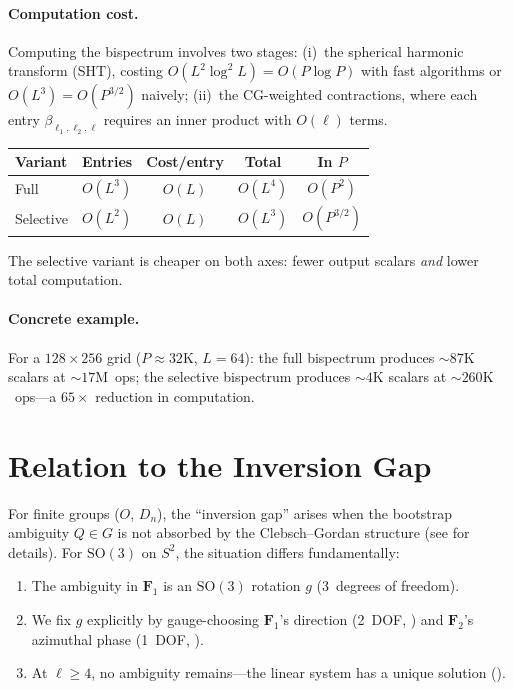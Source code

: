 \documentclass{article}
\theoremstyle{plain}
\theoremstyle{definition}
\theoremstyle{remark}
\newcommand{\SO}{\mathrm{SO}}
\begin{document}
\paragraph{Computation cost.}
Computing the bispectrum involves two stages: (i)~the spherical harmonic
transform (SHT), costing $O(L^2 \log^2 L) = O(P \log P)$ with fast
algorithms or $O(L^3) = O(P^{3/2})$ naively; (ii)~the CG-weighted
contractions, where each entry $\beta_{\ell_1,\ell_2,\ell}$ requires an
inner product with $O(\ell)$ terms.
\begin{center}
\small
\begin{tabular}{lcccc}
  \toprule
  Variant & Entries & Cost/entry & Total & In $P$ \\
  \midrule
  Full & $O(L^3)$ & $O(L)$ & $O(L^4)$ & $O(P^2)$ \\
  Selective & $O(L^2)$ & $O(L)$ & $O(L^3)$ & $O(P^{3/2})$ \\
  \bottomrule
\end{tabular}
\end{center}
The selective variant is cheaper on both axes: fewer output scalars
\emph{and} lower total computation.

\paragraph{Concrete example.}
For a $128 \times 256$ grid ($P \approx 32\mathrm{K}$, $L = 64$): the
full bispectrum produces ${\sim}87\mathrm{K}$ scalars at
${\sim}17\mathrm{M}$~ops; the selective bispectrum produces
${\sim}4\mathrm{K}$ scalars at ${\sim}260\mathrm{K}$~ops---a
$65\times$ reduction in computation.


\section{Relation to the Inversion Gap}\label{sec:inversion-gap}

For finite groups ($O$, $D_n$), the ``inversion gap'' arises when the
bootstrap ambiguity $Q \in G$ is not absorbed by the Clebsch--Gordan
structure (see \cite{mataigne2024} for details). For $\SO(3)$ on $S^2$,
the situation differs fundamentally:

\begin{enumerate}[nosep]
  \item The ambiguity in $\mathbf{F}_1$ is an $\SO(3)$ rotation $g$
    (3~degrees of freedom).
  \item We fix $g$ explicitly by gauge-choosing $\mathbf{F}_1$'s
    direction (2~DOF, ) and $\mathbf{F}_2$'s azimuthal
    phase (1~DOF, ).
  \item At $\ell \ge 4$, no ambiguity remains---the linear system has
    a unique solution ().
\end{enumerate}
\end{document}
